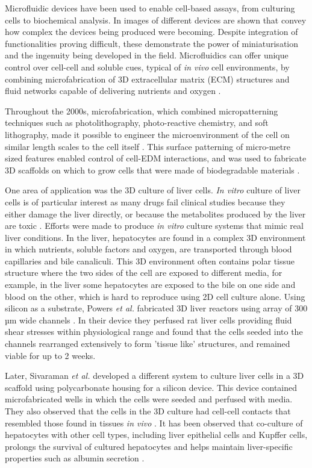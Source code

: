 Microfluidic devices have been used to enable cell-based assays, from culturing cells to biochemical analysis. In
 images of different devices are shown that convey how complex the devices being
produced were becoming. Despite integration of functionalities proving difficult, these demonstrate the
power of miniaturisation and the ingenuity being developed in the field.
Microfluidics can offer unique control over cell-cell and soluble cues, typical of
\textit{in vivo} cell environments, by combining microfabrication of 3D extracellular matrix (ECM)
structures and fluid networks capable of delivering nutrients and oxygen \citep{folch1999molding}.

Throughout the 2000s, microfabrication, which combined micropatterning techniques such as
photolithography, photo-reactive chemistry, and soft lithography, made it possible to engineer the
microenvironment of the cell on similar length scales to the cell itself \citep{folch2000microengineering}. This surface
patterning of micro-metre sized features enabled control of cell-EDM interactions, and was used
to fabricate 3D scaffolds on which to grow cells that were made of biodegradable
materials \citep{tsang2004three}.

One area of application was the 3D culture of liver cells. \textit{In vitro} culture
of liver cells is of particular interest as many drugs fail clinical studies because they
either damage the liver directly, or because the metabolites produced by the liver are toxic
\citep{sivaraman2005microscale}. Efforts were made to produce \textit{in vitro} culture
systems that mimic real liver conditions. In the liver, hepatocytes are found in a complex
3D environment in which nutrients, soluble factors and oxygen, are transported through blood
capillaries and bile canaliculi. This 3D environment often contains polar tissue structure
where the two sides of the cell are exposed to different media, for example, in the liver
some hepatocytes are exposed to the bile on one side and blood on the other, which
is hard to reproduce using 2D cell culture alone. Using silicon as a substrate, Powers \textit{et al.} fabricated
3D liver reactors using array of 300 µm wide channels \citep{powers2002microfabricated}. In their
device they perfused rat liver cells providing fluid shear stresses within physiological range and found
that the cells seeded into the channels rearranged extensively to form 'tissue like' structures, and
remained viable for up to 2 weeks.

Later, Sivaraman \textit{et al.} developed a different system to culture liver cells in a 3D scaffold
using polycarbonate housing for a silicon device. This device contained microfabricated wells in which the
cells were seeded and perfused with media. They also observed that the cells in the 3D culture
had cell-cell contacts that resembled those found in tissues \textit{in
vivo} \citep{sivaraman2005microscale}. It has been observed that co-culture of hepatocytes with other cell types,
including liver epithelial cells and Kupffer cells, prolongs the survival of cultured hepatocytes and helps maintain
liver-specific properties such as albumin secretion \citep{guguen1983maintenance}.

